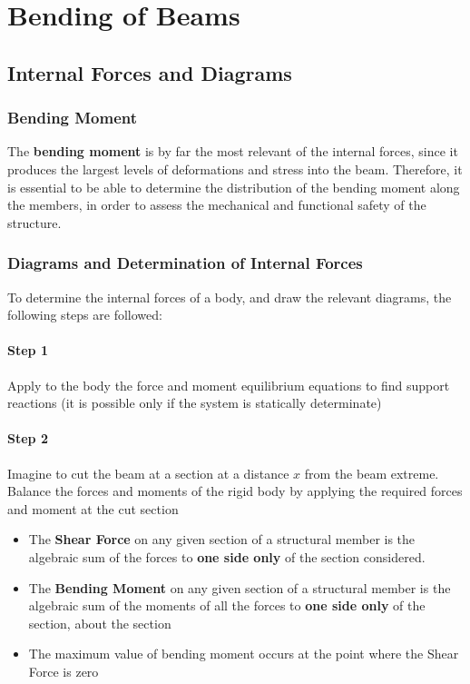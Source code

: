 \chapter{Bending of Beams}
\section{Internal Forces and Diagrams}
\subsection{Bending Moment}
The \textbf{bending moment}  is by far the most relevant of the internal forces, since it produces the largest levels of deformations and stress into the beam.
Therefore, it is essential to be able to determine the distribution of the bending moment along the members, in order to assess the mechanical and functional safety of the structure.
\subsection{Diagrams and Determination of Internal Forces}
To determine the internal forces of a body, and draw the relevant diagrams, the following steps are followed:
\subsubsection{Step 1}
Apply to the body the force and moment equilibrium equations to find support reactions (it is possible only if the system is statically determinate)
\subsubsection{Step 2}
Imagine to cut the beam at a section at a distance $x$ from the beam extreme. Balance the forces and moments of the rigid body by applying the required forces and moment at the cut section
\begin{itemize}[noitemsep]
  \item The \textbf{Shear Force} on any given section of a structural member is the algebraic sum of the forces to \textbf{one side only} of the section considered.
  \item The \textbf{Bending Moment} on any given section of a structural member is the algebraic sum of the moments of all the forces to \textbf{one side only} of the section, about the section
  \item The maximum value of bending moment occurs at the point where the Shear Force is zero
\end{itemize}
